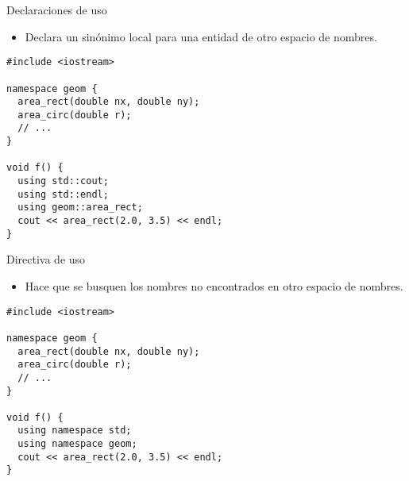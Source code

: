 \begin{frame}[fragile]{Declaraciones de uso}
\begin{itemize}
  \item Declara un sinónimo local para una entidad de otro espacio de nombres.
\end{itemize}
\begin{lstlisting}
#include <iostream>

namespace geom {
  area_rect(double nx, double ny);
  area_circ(double r);
  // ...
}

void f() {
  using std::cout;
  using std::endl;
  using geom::area_rect;
  cout << area_rect(2.0, 3.5) << endl;
}
\end{lstlisting}
\end{frame}

\begin{frame}[fragile]{Directiva de uso}
\begin{itemize}
  \item Hace que se busquen los nombres no encontrados en otro espacio de nombres.
\end{itemize}
\begin{lstlisting}
#include <iostream>

namespace geom {
  area_rect(double nx, double ny);
  area_circ(double r);
  // ...
}

void f() {
  using namespace std;
  using namespace geom;
  cout << area_rect(2.0, 3.5) << endl;
}
\end{lstlisting}
\end{frame}
